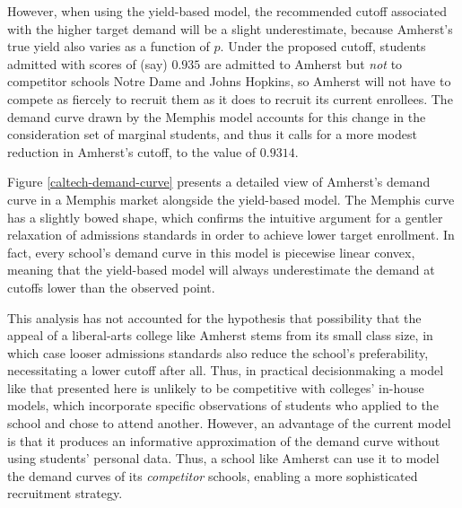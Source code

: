 \documentclass[12pt]{article}
\numberwithin{equation}{subsection}
\theoremstyle{definition}
\begin{document}
However, when using the yield-based model, the recommended cutoff associated with the higher target demand will be a slight underestimate, because Amherst's true yield also varies as a function of $p$. Under the proposed cutoff, students admitted with scores of (say) $0.935$ are admitted to Amherst but \emph{not} to competitor schools Notre Dame and Johns Hopkins, so Amherst will not have to compete as fiercely to recruit them as it does to recruit its current enrollees. The demand curve drawn by the Memphis model accounts for this change in the consideration set of marginal students, and thus it calls for a more modest reduction in Amherst's cutoff, to the value of $0.9314$.

Figure \ref{caltech-demand-curve} presents a detailed view of Amherst's demand curve in a Memphis market alongside the yield-based model. The Memphis curve has a slightly bowed shape, which confirms the intuitive argument for a gentler relaxation of admissions standards in order to achieve lower target enrollment. In fact, every school’s demand curve in this model is piecewise linear convex, meaning that the yield-based model will always underestimate the demand at cutoffs lower than the observed point.

This analysis has not accounted for the hypothesis that possibility that the appeal of a liberal-arts college like Amherst stems from its small class size, in which case looser admissions standards also reduce the school's preferability, necessitating a lower cutoff after all. Thus, in practical decisionmaking a model like that presented here is unlikely to be competitive with colleges' in-house models, which incorporate specific observations of students who applied to the school and chose to attend another. However, an advantage of the current model is that it produces an informative approximation of the demand curve without using students' personal data. Thus, a school like Amherst can use it to model the demand curves of its \emph{competitor} schools, enabling a more sophisticated recruitment strategy. 
\end{document}
